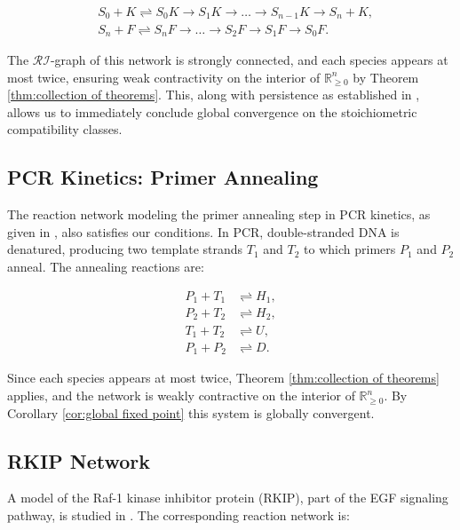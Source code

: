 \documentclass{article}
\begin{document}
\begin{align}
    &S_0 + K \rightleftharpoons S_0 K \rightarrow S_1 K \rightarrow \dots \rightarrow S_{n-1} K \rightarrow S_n + K, \\
    &S_n + F \rightleftharpoons S_n F \rightarrow \dots \rightarrow S_2 F \rightarrow S_1 F \rightarrow S_0 F.
\end{align}

The $\mathcal{RI}$-graph of this network is strongly connected, and each species appears at most twice, ensuring weak contractivity on the interior of \( \mathbb{R}^n_{\geq 0} \) by Theorem \ref{thm:collection of theorems}. This, along with persistence as established in \cite{EITHUN20171}, allows us to immediately conclude global convergence on the stoichiometric compatibility classes.

\subsection{PCR Kinetics: Primer Annealing}

The reaction network modeling the primer annealing step in PCR kinetics, as given in \cite{https://doi.org/10.1002/bit.20617}, also satisfies our conditions. In PCR, double-stranded DNA is denatured, producing two template strands \( T_1 \) and \( T_2 \) to which primers \( P_1 \) and \( P_2 \) anneal. The annealing reactions are:

\begin{align}
    P_1 + T_1 &\rightleftharpoons H_1, \\
    P_2 + T_2 &\rightleftharpoons H_2, \\
    T_1 + T_2 &\rightleftharpoons U, \\
    P_1 + P_2 &\rightleftharpoons D.
\end{align}

Since each species appears at most twice, Theorem \ref{thm:collection of theorems} applies, and the network is weakly contractive on the interior of \( \mathbb{R}^n_{\geq 0} \). By Corollary \ref{cor:global fixed point} this system is globally convergent.



\subsection{RKIP Network}

A model of the Raf-1 kinase inhibitor protein (RKIP), part of the EGF signaling pathway, is studied in \cite{Angeli2010-hj}. The corresponding reaction network is:
\end{document}
